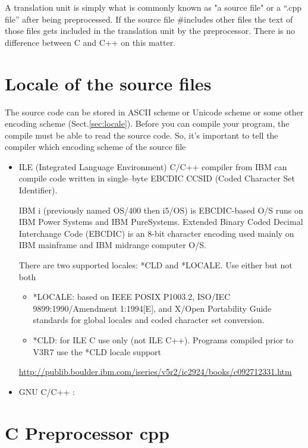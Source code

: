 A translation unit is simply what is commonly known as "a source file" or a
``.cpp file'' after being preprocessed. If the source file \#includes other
files the text of those files gets included in the translation unit by the
preprocessor. There is no difference between C and C++ on this matter.

 

\section{Locale of the source files}
\label{sec:locale_source-files}

The source code can be stored in ASCII scheme or Unicode scheme or some other
encoding scheme (Sect.\ref{sec:locale}). Before you can compile your program,
the compile must be able to read the source code. So, it's important to tell the
compiler which encoding scheme of the source file
\begin{itemize}
  \item ILE (Integrated Language Environment) C/C++ compiler from IBM can
  compile code written in single--byte EBCDIC CCSID (Coded Character Set
  Identifier).
  
IBM i (previously named OS/400 then i5/OS) is EBCDIC-based O/S runs on IBM Power
Systems and IBM PureSystems. Extended Binary Coded Decimal Interchange Code
(EBCDIC)  is an 8-bit character encoding used mainly on IBM mainframe and IBM
midrange computer O/S. 
  
  There are two supported locales: *CLD and *LOCALE. Use either but not both
  \begin{itemize}
    \item *LOCALE: based on IEEE POSIX P1003.2, ISO/IEC 9899:1990/Amendment
    1:1994[E], and X/Open Portability Guide standards for global locales and
    coded character set conversion. 
    \item *CLD: for ILE C use only (not ILE C++). Programs compiled prior to
    V3R7 use the *CLD locale support
  \end{itemize}
  \url{http://publib.boulder.ibm.com/iseries/v5r2/ic2924/books/c092712331.htm}
  
  \item GNU C/C++ : 
\end{itemize}

\section{C Preprocessor cpp}
\label{sec:cpp-preprocessor}

